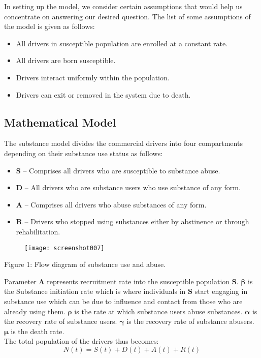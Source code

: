\documentclass[12pt]{report}
\begin{document}
In setting up the model, we consider certain assumptions that would help us concentrate on answering our desired question. The list of some  assumptions of the model is given as follows:
\begin{itemize}
	\item All drivers in susceptible population are enrolled at a constant rate.
	\item All drivers are born susceptible.
	\item Drivers interact uniformly within the population.
	\item Drivers can exit or removed in the system due to  death.
\end{itemize}

\subsection{Mathematical Model}

The substance model divides the commercial drivers into four compartments depending on their substance use status as follows:
\begin{itemize}
	\item \( \mathbf{S} \) – Comprises all drivers who are susceptible to substance abuse.
	\item \textbf{\( \mathbf{D} \)} – All drivers who are substance users who use substance of any form.
	\item \(\mathbf{A} \) – Comprises all drivers who abuse substances of any form.
	\item \(\mathbf{R}  \) – Drivers who stopped using substances either by abstinence or through rehabilitation.
\end{itemize}
\begin{figure}[htbp]
	\centering
	\texttt{[image: screenshot007]}
	
	\label{fig:screenshot007}
\end{figure}
\newpage
\begin{center}
	Figure 1: Flow diagram of substance use and abuse.
\end{center}
Parameter \( \mathbf{\Lambda} \) represents recruitment rate into the susceptible population \( \mathbf{S} \). \( \bm{\beta }\) is the Substance initiation rate  which is where individuals in \( \mathbf{S} \) start engaging in substance use which can be   due to influence and contact from those who are already using them. \(\bm{ \rho} \) is the rate at which substance users abuse substances. \( \bm{\alpha} \) is the recovery rate of substance users. \(\bm{ \gamma} \) is the recovery rate of substance abusers. \(\bm{ \mu} \) is the death rate.\\ The total population of the drivers thus becomes:
\[
N(t) = S(t) + D(t) + A(t) + R(t)
\]
\end{document}
